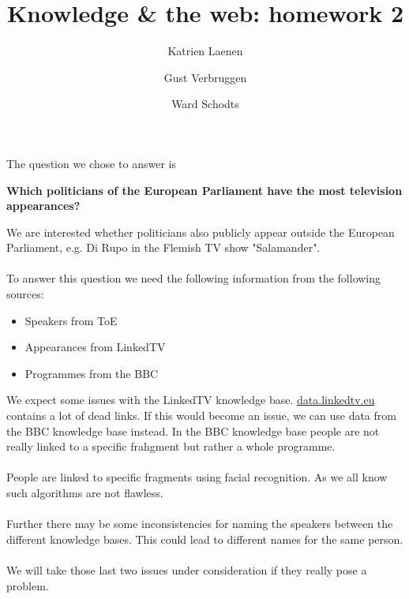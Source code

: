 \documentclass[12pt,a4paper]{article}
\author{
  Katrien Laenen\\
  \and
  Gust Verbruggen\\
  \and
  Ward Schodts
}
\title{Knowledge \& the web: homework 2}
\begin{document}
\maketitle

The question we chose to answer is 

\begin{center}
\bf \large Which politicians of the European Parliament have the most television appearances?
\end{center}
We are interested whether politicians also publicly appear outside the European Parliament, e.g. Di Rupo in the Flemish TV show "Salamander".
\\
\\
To answer this question we need the following information from the following sources:
\begin{itemize}
\item Speakers from ToE
\item Appearances from LinkedTV
\item Programmes from the BBC
\end{itemize}

We expect some issues with the LinkedTV knowledge base. \url{data.linkedtv.eu} contains a lot of dead links. If this would become an issue, we can use data from the BBC knowledge base instead. In the BBC knowledge base people are not really linked to a specific frahgment but rather a whole programme.
\\
\\
People are linked to specific fragments using facial recognition. As we all know such algorithms are not flawless.
\\
\\
Further there may be some inconsistencies for naming the speakers between the different knowledge bases. This could lead to different names for the same person.
\\
\\
We will take those last two issues under consideration if they really pose a problem.
\end{document}
